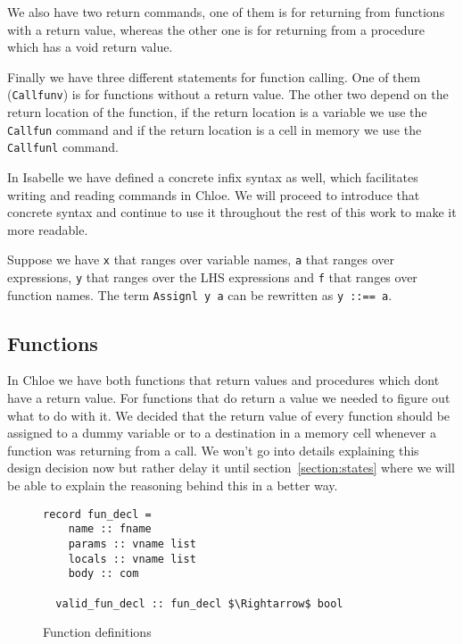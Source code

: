 We also have two return commands, one of them is for returning from functions with a return value, whereas the other one is for returning from a procedure which has a void return value.

Finally we have three different statements for function calling.
One of them (\verb|Callfunv|) is for functions without a return value.
The other two depend on the return location of the function, if the return location is a variable we use the \verb|Callfun| command and if the return location is a cell in memory we use the \verb|Callfunl| command.

In Isabelle we have defined a concrete infix syntax as well, which facilitates writing and reading commands in Chloe.
We will proceed to introduce that concrete syntax and continue to use it throughout the rest of this work to make it more readable.

Suppose we have \verb|x| that ranges over variable names, \verb|a| that ranges over expressions, \verb|y| that ranges over the LHS expressions and \verb|f| that ranges over function names.
The term \verb|Assignl y a| can be rewritten as \verb|y ::== a|.

\subsection{Functions}\label{subsection:functions_commands}

In Chloe we have both functions that return values and procedures which dont have a return value.
For functions that do return a value we needed to figure out what to do with it.
We decided that the return value of every function should be assigned to a dummy variable or to a destination in a memory cell whenever a function was returning from a call.
We won't go into details explaining this design decision now but rather delay it until section~\ref{section:states} where we will be able to explain the reasoning behind this in a better way.

\begin{figure}
  \caption{Function definitions}
  \label{fig:fun_def}

  \begin{lstlisting}[frame=single]
  record fun_decl =
    name :: fname
    params :: vname list
    locals :: vname list
    body :: com

  valid_fun_decl :: fun_decl $\Rightarrow$ bool
  \end{lstlisting}
\end{figure}

